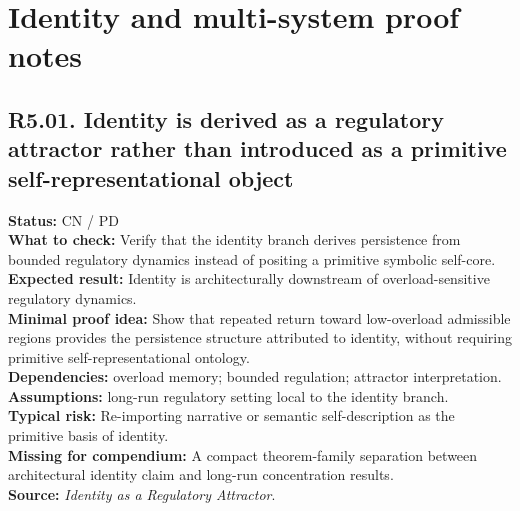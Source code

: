 \documentclass[12pt]{article}
\begin{document}
	\section{Identity and multi-system proof notes}
	
	\subsection*{R5.01. Identity is derived as a regulatory attractor rather than introduced as a primitive self-representational object}
	\textbf{Status:} CN / PD \\
	\textbf{What to check:} Verify that the identity branch derives persistence from bounded regulatory dynamics instead of positing a primitive symbolic self-core. \\
	\textbf{Expected result:} Identity is architecturally downstream of overload-sensitive regulatory dynamics. \\
	\textbf{Minimal proof idea:} Show that repeated return toward low-overload admissible regions provides the persistence structure attributed to identity, without requiring primitive self-representational ontology. \\
	\textbf{Dependencies:} overload memory; bounded regulation; attractor interpretation. \\
	\textbf{Assumptions:} long-run regulatory setting local to the identity branch. \\
	\textbf{Typical risk:} Re-importing narrative or semantic self-description as the primitive basis of identity. \\
	\textbf{Missing for compendium:} A compact theorem-family separation between architectural identity claim and long-run concentration results. \\
	\textbf{Source:} \emph{Identity as a Regulatory Attractor}.
	
\end{document}
